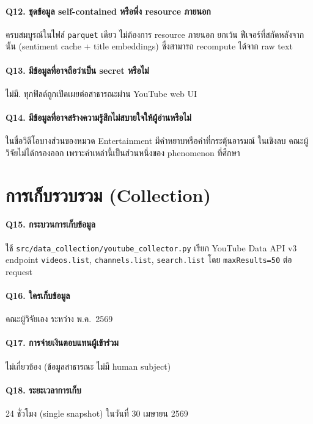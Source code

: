 \paragraph{Q12. ชุดข้อมูล self-contained หรือพึ่ง resource ภายนอก}
ครบสมบูรณ์ในไฟล์ \texttt{parquet} เดียว ไม่ต้องการ resource ภายนอก ยกเว้น
ฟีเจอร์ที่สกัดหลังจากนั้น (sentiment cache + title embeddings) ซึ่งสามารถ
recompute ได้จาก raw text

\paragraph{Q13. มีข้อมูลที่อาจถือว่าเป็น secret หรือไม่}
ไม่มี. ทุกฟิลด์ถูกเปิดเผยต่อสาธารณะผ่าน YouTube web UI

\paragraph{Q14. มีข้อมูลที่อาจสร้างความรู้สึกไม่สบายใจให้ผู้อ่านหรือไม่}
ในชื่อวิดีโอบางส่วนของหมวด Entertainment มีคำหยาบหรือคำที่กระตุ้นอารมณ์
ในเชิงลบ คณะผู้วิจัยไม่ได้กรองออก เพราะคำเหล่านี้เป็นส่วนหนึ่งของ phenomenon
ที่ศึกษา

\section{การเก็บรวบรวม (Collection)}

\paragraph{Q15. กระบวนการเก็บข้อมูล}
ใช้ \texttt{src/data\_collection/youtube\_collector.py} เรียก
YouTube Data API v3 endpoint \texttt{videos.list}, \texttt{channels.list},
\texttt{search.list} โดย \texttt{maxResults=50} ต่อ request

\paragraph{Q16. ใครเก็บข้อมูล}
คณะผู้วิจัยเอง ระหว่าง พ.ค.\ 2569

\paragraph{Q17. การจ่ายเงินตอบแทนผู้เข้าร่วม}
ไม่เกี่ยวข้อง (ข้อมูลสาธารณะ ไม่มี human subject)

\paragraph{Q18. ระยะเวลาการเก็บ}
24 ชั่วโมง (single snapshot) ในวันที่ 30 เมษายน 2569

